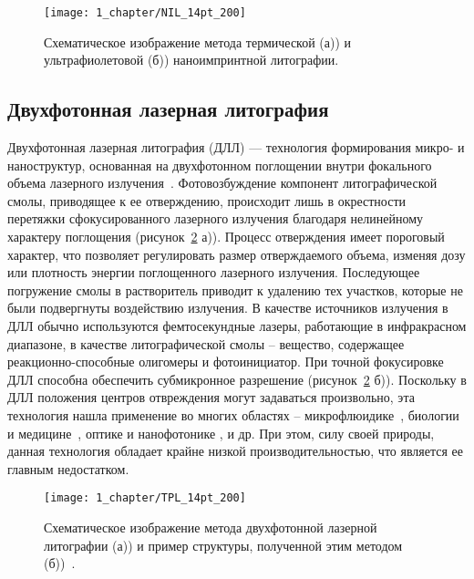 \begin{figure}[t]
	\centering
	\texttt{[image: 1\_chapter/NIL\_14pt\_200]}
	\vspace{1em}
	\caption{Схематическое изображение метода термической (а)) и ультрафиолетовой (б)) наноимпринтной литографии.}
	\label{fig:NIL}
\end{figure}


\subsection{Двухфотонная лазерная литография}

Двухфотонная лазерная литография (ДЛЛ) — технология формирования микро- и наноструктур, основанная на двухфотонном поглощении внутри фокального объема лазерного излучения~\cite{Hohmann2015, Kawata2001}. Фотовозбуждение компонент литографической смолы, приводящее к ее отверждению, происходит лишь в окрестности перетяжки сфокусированного лазерного излучения благодаря нелинейному характеру поглощения (рисунок~\ref{fig:TPL} а)). Процесс отверждения имеет пороговый характер, что позволяет регулировать размер отверждаемого объема, изменяя дозу или плотность энергии поглощенного лазерного излучения. Последующее погружение смолы в растворитель приводит к удалению тех участков, которые не были подвергнуты воздействию излучения. В качестве источников излучения в ДЛЛ обычно используются фемтосекундные лазеры, работающие в инфракрасном диапазоне, в качестве литографической смолы -- вещество, содержащее реакционно-способные олигомеры и фотоинициатор. При точной фокусировке ДЛЛ способна обеспечить субмикронное разрешение (рисунок~\ref{fig:TPL} б)). Поскольку в ДЛЛ положения центров отвреждения могут задаваться произвольно, эта технология нашла применение во многих областях -- микрофлюидике~\cite{TPL_microfluidics_1, TPL_microfluidics_2}, биологии и \linebreak медицине~\cite{TPL_biology_1, TPL_biology_2}, оптике и нанофотонике \cite{TPL_optics, TPL_nanophotonics}, и др. При этом, силу своей природы, данная технология обладает крайне низкой производительностью, что является ее главным недостатком.

\begin{figure}[h]
	\centering
	\texttt{[image: 1\_chapter/TPL\_14pt\_200]}
	\vspace{1em}
	\caption{Схематическое изображение метода двухфотонной лазерной литографии (а)) и пример структуры, полученной этим методом (б))~\cite{TPL_castle}.}
	\label{fig:TPL}
\end{figure}


